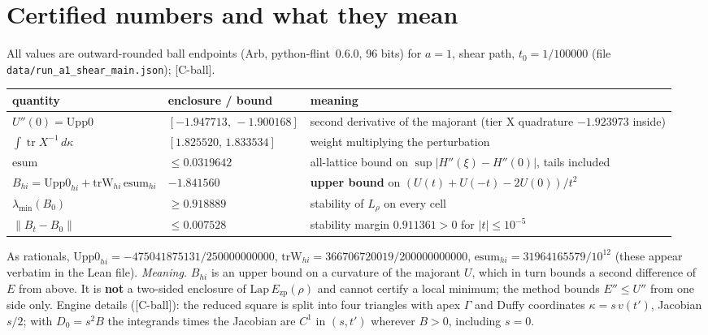 \documentclass[10pt]{article}
\newcommand{\tCb}{\textcolor{blue!60!black}{\textsf{[C-ball]}}}
\newcommand{\Ezp}{E_{\mathrm{zp}}}
\newcommand{\tr}{\operatorname{tr}}
\begin{document}
\section{Certified numbers and what they mean}\label{sec:numbers}
All values are outward-rounded ball endpoints (Arb, python-flint~0.6.0, 96 bits) for $a=1$, shear path, $t_0=1/100000$ (file \texttt{data/run\_a1\_shear\_main.json}); \tCb{}.
\begin{center}\small\begin{tabular}{p{4.3cm}p{3.6cm}p{7.0cm}}\toprule
quantity & enclosure / bound & meaning\\\midrule
$U''(0)=\mathrm{Upp0}$ & $[-1.947713,\,-1.900168]$ & second derivative of the majorant (tier X quadrature $-1.923973$ inside)\\
$\int\tr X^{-1}\,d\kappa$ & $[1.825520,\,1.833534]$ & weight multiplying the perturbation\\
$\mathrm{esum}$ & $\le0.0319642$ & all-lattice bound on $\sup|H''(\xi)-H''(0)|$, tails included\\
$B_{hi}=\mathrm{Upp0}_{hi}+\mathrm{trW}_{hi}\,\mathrm{esum}_{hi}$ & $-1.841560$ & \textbf{upper bound} on $(U(t)+U(-t)-2U(0))/t^2$\\
$\lambda_{\min}(B_0)$ & $\ge0.918889$ & stability of $L_\rho$ on every cell\\
$\|B_t-B_0\|$ & $\le0.007528$ & stability margin $0.911361>0$ for $|t|\le10^{-5}$\\
\bottomrule\end{tabular}\end{center}
As rationals, $\mathrm{Upp0}_{hi}=-475041875131/250000000000$, $\mathrm{trW}_{hi}=366706720019/200000000000$, $\mathrm{esum}_{hi}=31964165579/10^{12}$ (these appear verbatim in the Lean file).
\emph{Meaning.} $B_{hi}$ is an upper bound on a curvature of the majorant $U$, which in turn bounds a second difference of $E$ from above. It is \textbf{not} a two-sided enclosure of $\mathrm{Lap}\,\Ezp(\rho)$ and cannot certify a local minimum; the method bounds $E''\le U''$ from one side only.
Engine details (\tCb{}): the reduced square is split into four triangles with apex $\Gamma$ and Duffy coordinates $\kappa=s\,v(t')$, Jacobian $s/2$; with $D_0=s^2B$ the integrands times the Jacobian are $C^1$ in $(s,t')$ wherever $B>0$, including $s=0$.
\end{document}
